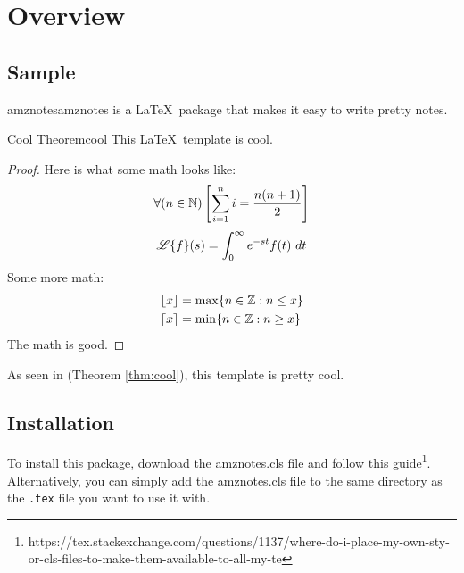 \documentclass[math,code]{amznotes}
\begin{document}
    \tableofcontents

    \chapter{Overview}

    \section{Sample}

    \begin{dfnbox}{amznotes}{amznotes}
         is a \LaTeX\ package that makes it easy to write pretty notes.
    \end{dfnbox}

    \begin{thmbox}{Cool Theorem}{cool}
        This \LaTeX\ template is cool.
        \tcblower
        \begin{proof}
            Here is what some math looks like:
            \[ \forall (n \in \mathbb{N}) \left[ \sum_{i=1}^n i = \frac{n(n+1)}{2} \right] \]
            \[ \operatorname{\mathscr{L}} \{ f \} (s) = \int_{0}^{\infty} e^{-st} f(t)\ dt \]
            Some more math:
            \begin{align*}
                \lfloor x\rfloor &= \max \{ n \in \mathbb{Z} : n \leq x \} \\
                \lceil x\rceil &= \min \{ n \in \mathbb{Z} : n \geq x \}
            \end{align*}
            The math is good.
        \end{proof}
    \end{thmbox}

    As seen in  (Theorem \ref{thm:cool}), this template is pretty cool.

    \section{Installation}
    To install this package, download the \href{https://raw.githubusercontent.com/alexmingzhang/latex-notes-template/main/amznotes.cls}{amznotes.cls} file and follow \href{https://tex.stackexchange.com/questions/1137/where-do-i-place-my-own-sty-or-cls-files-to-make-them-available-to-all-my-te}{this guide}\footnote{https://tex.stackexchange.com/questions/1137/where-do-i-place-my-own-sty-or-cls-files-to-make-them-available-to-all-my-te}. Alternatively, you can simply add the amznotes.cls file to the same directory as the \texttt{.tex} file you want to use it with.
\end{document}
